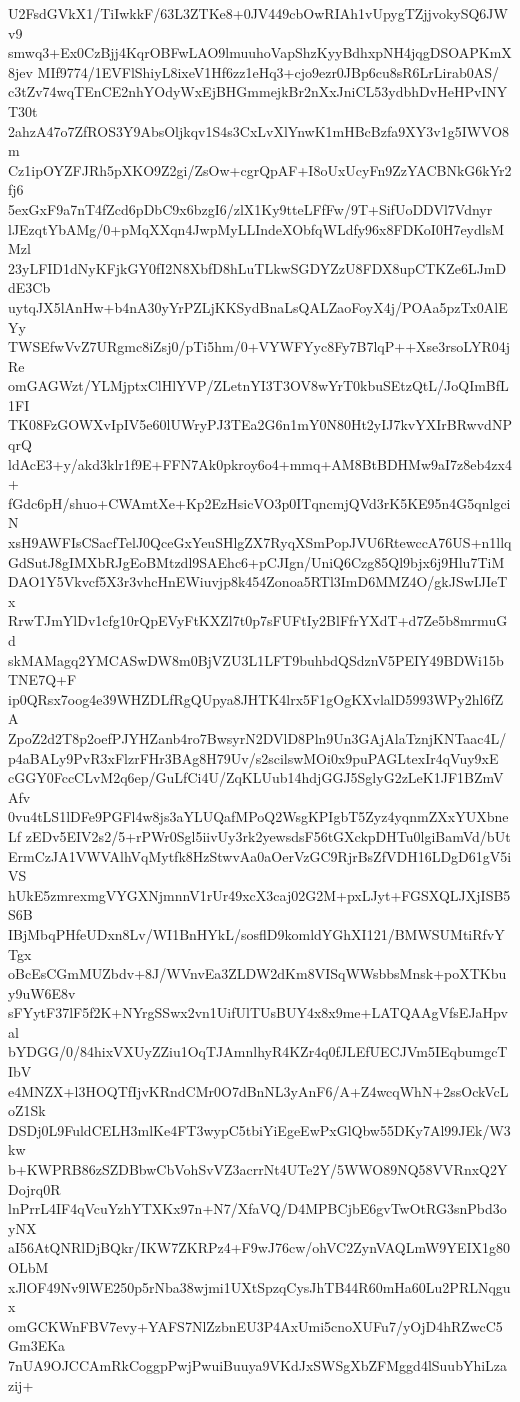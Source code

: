 U2FsdGVkX1/TiIwkkF/63L3ZTKe8+0JV449cbOwRIAh1vUpygTZjjvokySQ6JWv9
smwq3+Ex0CzBjj4KqrOBFwLAO9lmuuhoVapShzKyyBdhxpNH4jqgDSOAPKmX8jev
MIf9774/1EVFlShiyL8ixeV1Hf6zz1eHq3+cjo9ezr0JBp6cu8sR6LrLirab0AS/
c3tZv74wqTEnCE2nhYOdyWxEjBHGmmejkBr2nXxJniCL53ydbhDvHeHPvINYT30t
2ahzA47o7ZfROS3Y9AbsOljkqv1S4s3CxLvXlYnwK1mHBcBzfa9XY3v1g5IWVO8m
Cz1ipOYZFJRh5pXKO9Z2gi/ZsOw+cgrQpAF+I8oUxUcyFn9ZzYACBNkG6kYr2fj6
5exGxF9a7nT4fZcd6pDbC9x6bzgI6/zlX1Ky9tteLFfFw/9T+SifUoDDVl7Vdnyr
lJEzqtYbAMg/0+pMqXXqn4JwpMyLLIndeXObfqWLdfy96x8FDKoI0H7eydlsMMzl
23yLFID1dNyKFjkGY0fI2N8XbfD8hLuTLkwSGDYZzU8FDX8upCTKZe6LJmDdE3Cb
uytqJX5lAnHw+b4nA30yYrPZLjKKSydBnaLsQALZaoFoyX4j/POAa5pzTx0AlEYy
TWSEfwVvZ7URgmc8iZsj0/pTi5hm/0+VYWFYyc8Fy7B7lqP++Xse3rsoLYR04jRe
omGAGWzt/YLMjptxClHlYVP/ZLetnYI3T3OV8wYrT0kbuSEtzQtL/JoQImBfL1FI
TK08FzGOWXvIpIV5e60lUWryPJ3TEa2G6n1mY0N80Ht2yIJ7kvYXIrBRwvdNPqrQ
ldAcE3+y/akd3klr1f9E+FFN7Ak0pkroy6o4+mmq+AM8BtBDHMw9aI7z8eb4zx4+
fGdc6pH/shuo+CWAmtXe+Kp2EzHsicVO3p0ITqncmjQVd3rK5KE95n4G5qnlgciN
xsH9AWFIsCSacfTelJ0QceGxYeuSHlgZX7RyqXSmPopJVU6RtewccA76US+n1llq
GdSutJ8gIMXbRJgEoBMtzdl9SAEhc6+pCJIgn/UniQ6Czg85Ql9bjx6j9Hlu7TiM
DAO1Y5Vkvcf5X3r3vhcHnEWiuvjp8k454Zonoa5RTl3ImD6MMZ4O/gkJSwIJIeTx
RrwTJmYlDv1cfg10rQpEVyFtKXZl7t0p7sFUFtIy2BlFfrYXdT+d7Ze5b8mrmuGd
skMAMagq2YMCASwDW8m0BjVZU3L1LFT9buhbdQSdznV5PEIY49BDWi15bTNE7Q+F
ip0QRsx7oog4e39WHZDLfRgQUpya8JHTK4lrx5F1gOgKXvlalD5993WPy2hl6fZA
ZpoZ2d2T8p2oefPJYHZanb4ro7BwsyrN2DVlD8Pln9Un3GAjAlaTznjKNTaac4L/
p4aBALy9PvR3xFlzrFHr3BAg8H79Uv/s2scilswMOi0x9puPAGLtexIr4qVuy9xE
cGGY0FccCLvM2q6ep/GuLfCi4U/ZqKLUub14hdjGGJ5SglyG2zLeK1JF1BZmVAfv
0vu4tLS1lDFe9PGFl4w8js3aYLUQafMPoQ2WsgKPIgbT5Zyz4yqnmZXxYUXbneLf
zEDv5EIV2s2/5+rPWr0Sgl5iivUy3rk2yewsdsF56tGXckpDHTu0lgiBamVd/bUt
ErmCzJA1VWVAlhVqMytfk8HzStwvAa0aOerVzGC9RjrBsZfVDH16LDgD61gV5iVS
hUkE5zmrexmgVYGXNjmnnV1rUr49xcX3caj02G2M+pxLJyt+FGSXQLJXjISB5S6B
IBjMbqPHfeUDxn8Lv/WI1BnHYkL/sosflD9komldYGhXI121/BMWSUMtiRfvYTgx
oBcEsCGmMUZbdv+8J/WVnvEa3ZLDW2dKm8VISqWWsbbsMnsk+poXTKbuy9uW6E8v
sFYytF37lF5f2K+NYrgSSwx2vn1UifUlTUsBUY4x8x9me+LATQAAgVfsEJaHpval
bYDGG/0/84hixVXUyZZiu1OqTJAmnlhyR4KZr4q0fJLEfUECJVm5IEqbumgcTIbV
e4MNZX+l3HOQTfIjvKRndCMr0O7dBnNL3yAnF6/A+Z4wcqWhN+2ssOckVcLoZ1Sk
DSDj0L9FuldCELH3mlKe4FT3wypC5tbiYiEgeEwPxGlQbw55DKy7Al99JEk/W3kw
b+KWPRB86zSZDBbwCbVohSvVZ3acrrNt4UTe2Y/5WWO89NQ58VVRnxQ2YDojrq0R
lnPrrL4IF4qVcuYzhYTXKx97n+N7/XfaVQ/D4MPBCjbE6gvTwOtRG3snPbd3oyNX
aI56AtQNRlDjBQkr/IKW7ZKRPz4+F9wJ76cw/ohVC2ZynVAQLmW9YEIX1g80OLbM
xJlOF49Nv9lWE250p5rNba38wjmi1UXtSpzqCysJhTB44R60mHa60Lu2PRLNqgux
omGCKWnFBV7evy+YAFS7NlZzbnEU3P4AxUmi5cnoXUFu7/yOjD4hRZwcC5Gm3EKa
7nUA9OJCCAmRkCoggpPwjPwuiBuuya9VKdJxSWSgXbZFMggd4lSuubYhiLzazij+
